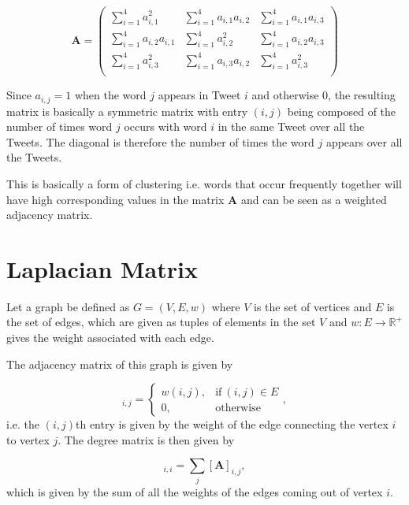 \documentclass[11pt,a4paper]{article}
\newcommand{\covmat}{\mathbf{A}}
\begin{document}
\begin{equation}
\covmat =
\left( \begin{matrix}
\sum_{i=1}^4 a_{i,1}^2& \sum_{i=1}^4 a_{i,1} a_{i,2} &  \sum_{i=1}^4 a_{i,1} a_{i,3} \\ 
\sum_{i=1}^4 a_{i,2}a_{i, 1} & \sum_{i=1}^4 a_{i,2}^2 &  \sum_{i=1}^4 a_{i,2} a_{i,3} \\ 
\sum_{i=1}^4 a_{i,3}^2& \sum_{i=1}^4 a_{i,3} a_{i,2} &  \sum_{i=1}^4  a_{i,3}^2 \\ 
\end{matrix} \right)
\end{equation}

Since $a_{i, j} = 1$ when the word $j$ appears in Tweet $i$ and otherwise 0, the resulting matrix is basically a symmetric matrix with entry $(i, j)$ being composed of the number of times word $j$ occurs with word $i$ in the same Tweet over all the Tweets. The diagonal is  therefore the number of times the word $j$ appears over all the Tweets.

This is basically a form of clustering i.e. words that occur frequently together will have high corresponding values in the matrix $\covmat$ and can be seen as a weighted adjacency matrix.

\section{Laplacian Matrix}
Let a graph be defined as $G = (V, E, w)$ where $V$ is the set of vertices and $E$ is the set of edges, which are given as tuples of elements in the set $V$ and $w: E \rightarrow \mathbb{R}^+$ gives the weight associated with each edge. 

The adjacency matrix of this graph is given by

\begin{equation*}
[\mathbf{A}]_{i, j} = \begin{cases}
w(i, j), & \text{if}\ (i, j) \in E \\
      0, & \text{otherwise}
\end{cases}, 
\end{equation*}
i.e. the $(i, j)$th entry is given by the weight of the edge connecting the  vertex $i$ to vertex $j$.
The degree matrix is then given by

\begin{equation*}
[\mathbf{D}]_{i, i} = 
\sum_j [\mathbf{A}]_{i, j},
\end{equation*}
which is given by the sum of all the weights of the edges coming out of vertex $i$.
\end{document}
